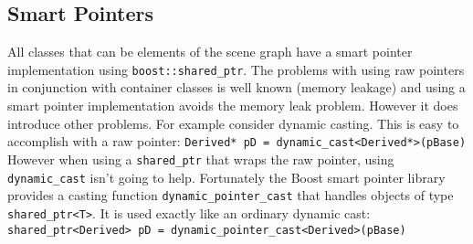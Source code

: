 \documentclass{article}
\begin{document}
\subsection{Smart Pointers}
All classes that can be elements of the scene graph have a smart pointer
implementation using \verb|boost::shared_ptr|. The problems with using raw pointers in
conjunction with container classes is well known (memory leakage) and using a
smart pointer implementation avoids the memory leak problem. However it does
introduce other problems. For example consider dynamic casting. This is easy to
accomplish with a raw pointer:
\newline
\verb|Derived* pD = dynamic_cast<Derived*>(pBase)|
\newline
However when using a \verb|shared_ptr| that wraps the raw pointer, using
\verb|dynamic_cast| isn't going to help. Fortunately the Boost smart pointer
library provides a casting function \verb|dynamic_pointer_cast| that handles objects 
of type \verb|shared_ptr<T>|. It is used exactly like an ordinary dynamic cast:
\newline
\verb|shared_ptr<Derived> pD = dynamic_pointer_cast<Derived>(pBase)|
\newline
\end{document}
